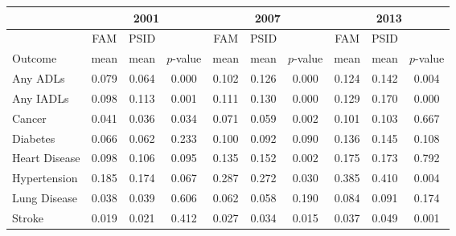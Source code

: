 \begin{tabular}{p{1.2in}*{3}{c}*{3}{c}*{3}{c}}
\toprule
 \multicolumn{1}{c}{} & \multicolumn{3}{c}{2001} & \multicolumn{3}{c}{2007} & \multicolumn{3}{c}{2013} \\
\midrule
 \multicolumn{1}{c}{} & FAM & PSID & & FAM & PSID & & FAM & PSID & \\
 \multicolumn{1}{l}{Outcome} & mean & mean & $p$-value & mean & mean & $p$-value & mean & mean & $p$-value \\
\midrule
Any ADLs&0.079&0.064&0.000&0.102&0.126&0.000&0.124&0.142&0.004\\
Any IADLs&0.098&0.113&0.001&0.111&0.130&0.000&0.129&0.170&0.000\\
Cancer&0.041&0.036&0.034&0.071&0.059&0.002&0.101&0.103&0.667\\
Diabetes&0.066&0.062&0.233&0.100&0.092&0.090&0.136&0.145&0.108\\
Heart Disease&0.098&0.106&0.095&0.135&0.152&0.002&0.175&0.173&0.792\\
Hypertension&0.185&0.174&0.067&0.287&0.272&0.030&0.385&0.410&0.004\\
Lung Disease&0.038&0.039&0.606&0.062&0.058&0.190&0.084&0.091&0.174\\
Stroke&0.019&0.021&0.412&0.027&0.034&0.015&0.037&0.049&0.001\\
\bottomrule
\end{tabular}

